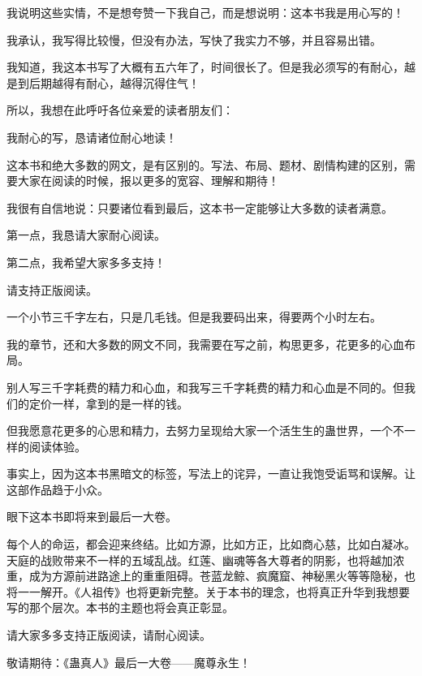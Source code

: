 \begin{this_body}
我说明这些实情，不是想夸赞一下我自己，而是想说明：这本书我是用心写的！

我承认，我写得比较慢，但没有办法，写快了我实力不够，并且容易出错。

我知道，我这本书写了大概有五六年了，时间很长了。但是我必须写的有耐心，越是到后期越得有耐心，越得沉得住气！

所以，我想在此呼吁各位亲爱的读者朋友们：

我耐心的写，恳请诸位耐心地读！

这本书和绝大多数的网文，是有区别的。写法、布局、题材、剧情构建的区别，需要大家在阅读的时候，报以更多的宽容、理解和期待！

我很有自信地说：只要诸位看到最后，这本书一定能够让大多数的读者满意。

第一点，我恳请大家耐心阅读。

第二点，我希望大家多多支持！

请支持正版阅读。

一个小节三千字左右，只是几毛钱。但是我要码出来，得要两个小时左右。

我的章节，还和大多数的网文不同，我需要在写之前，构思更多，花更多的心血布局。

别人写三千字耗费的精力和心血，和我写三千字耗费的精力和心血是不同的。但我们的定价一样，拿到的是一样的钱。

但我愿意花更多的心思和精力，去努力呈现给大家一个活生生的蛊世界，一个不一样的阅读体验。

事实上，因为这本书黑暗文的标签，写法上的诧异，一直让我饱受诟骂和误解。让这部作品趋于小众。

眼下这本书即将来到最后一大卷。

每个人的命运，都会迎来终结。比如方源，比如方正，比如商心慈，比如白凝冰。天庭的战败带来不一样的五域乱战。红莲、幽魂等各大尊者的阴影，也将越加浓重，成为方源前进路途上的重重阻碍。苍蓝龙鲸、疯魔窟、神秘黑火等等隐秘，也将一一解开。《人祖传》也将更新完整。关于本书的理念，也将真正升华到我想要写的那个层次。本书的主题也将会真正彰显。

请大家多多支持正版阅读，请耐心阅读。

敬请期待：《蛊真人》最后一大卷——魔尊永生！

\end{this_body}


